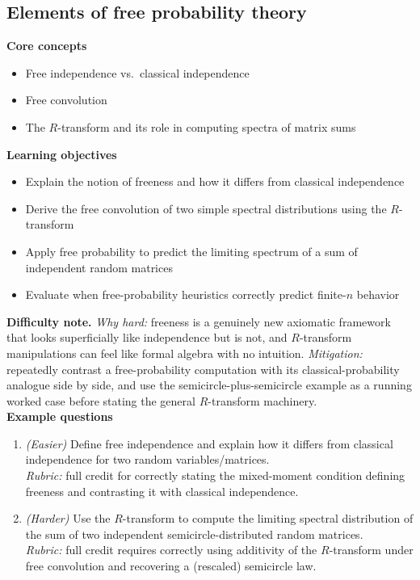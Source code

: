 \documentclass[11pt]{article}
\begin{document}
\subsection{Elements of free probability theory}
\textbf{Core concepts}
\begin{itemize}[nosep]
\item Free independence vs.\ classical independence
\item Free convolution
\item The $R$-transform and its role in computing spectra of matrix sums
\end{itemize}
\textbf{Learning objectives}
\begin{itemize}[nosep]
\item Explain the notion of freeness and how it differs from classical independence
\item Derive the free convolution of two simple spectral distributions using the $R$-transform
\item Apply free probability to predict the limiting spectrum of a sum of independent random matrices
\item Evaluate when free-probability heuristics correctly predict finite-$n$ behavior
\end{itemize}
\textbf{Difficulty note.} \emph{Why hard:} freeness is a genuinely new axiomatic framework that looks superficially like independence but is not, and $R$-transform manipulations can feel like formal algebra with no intuition. \emph{Mitigation:} repeatedly contrast a free-probability computation with its classical-probability analogue side by side, and use the semicircle-plus-semicircle example as a running worked case before stating the general $R$-transform machinery.\\[4pt]
\textbf{Example questions}
\begin{enumerate}[nosep]
\item \emph{(Easier)} Define free independence and explain how it differs from classical independence for two random variables/matrices. \\
\emph{Rubric:} full credit for correctly stating the mixed-moment condition defining freeness and contrasting it with classical independence.
\item \emph{(Harder)} Use the $R$-transform to compute the limiting spectral distribution of the sum of two independent semicircle-distributed random matrices. \\
\emph{Rubric:} full credit requires correctly using additivity of the $R$-transform under free convolution and recovering a (rescaled) semicircle law.
\end{enumerate}
\end{document}
